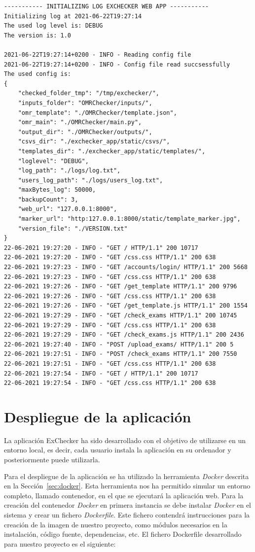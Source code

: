 \documentclass[a4paper, 12pt]{book}
\begin{document}
{\footnotesize
\begin{verbatim}
----------- INITIALIZING LOG EXCHECKER WEB APP -----------
Initializing log at 2021-06-22T19:27:14
The used log level is: DEBUG
The version is: 1.0

2021-06-22T19:27:14+0200 - INFO - Reading config file
2021-06-22T19:27:14+0200 - INFO - Config file read succsessfully
The used config is:
{
    "checked_folder_tmp": "/tmp/exchecker/",
    "inputs_folder": "OMRChecker/inputs/",
    "omr_template": "./OMRChecker/template.json",
    "omr_main": "./OMRChecker/main.py",
    "output_dir": "./OMRChecker/outputs/",
    "csvs_dir": "./exchecker_app/static/csvs/",
    "templates_dir": "./exchecker_app/static/templates/",
    "loglevel": "DEBUG",
    "log_path": "./logs/log.txt",
    "users_log_path": "./logs/users_log.txt",
    "maxBytes_log": 50000,
    "backupCount": 3,
    "web_url": "127.0.0.1:8000",
    "marker_url": "http:127.0.0.1:8000/static/template_marker.jpg",
    "version_file": "./VERSION.txt"
}
22-06-2021 19:27:20 - INFO - "GET / HTTP/1.1" 200 10717
22-06-2021 19:27:20 - INFO - "GET /css.css HTTP/1.1" 200 638
22-06-2021 19:27:23 - INFO - "GET /accounts/login/ HTTP/1.1" 200 5668
22-06-2021 19:27:23 - INFO - "GET /css.css HTTP/1.1" 200 638
22-06-2021 19:27:26 - INFO - "GET /get_template HTTP/1.1" 200 9796
22-06-2021 19:27:26 - INFO - "GET /css.css HTTP/1.1" 200 638
22-06-2021 19:27:26 - INFO - "GET /get_template.js HTTP/1.1" 200 1554
22-06-2021 19:27:29 - INFO - "GET /check_exams HTTP/1.1" 200 10745
22-06-2021 19:27:29 - INFO - "GET /css.css HTTP/1.1" 200 638
22-06-2021 19:27:29 - INFO - "GET /check_exams.js HTTP/1.1" 200 2436
22-06-2021 19:27:40 - INFO - "POST /upload_exams/ HTTP/1.1" 200 5
22-06-2021 19:27:51 - INFO - "POST /check_exams HTTP/1.1" 200 7550
22-06-2021 19:27:51 - INFO - "GET /css.css HTTP/1.1" 200 638
22-06-2021 19:27:54 - INFO - "GET / HTTP/1.1" 200 10717
22-06-2021 19:27:54 - INFO - "GET /css.css HTTP/1.1" 200 638
\end{verbatim}
}

\section{Despliegue de la aplicación} 
\label{sec:despliegue}

La aplicación ExChecker ha sido desarrollado con el objetivo de utilizarse en
un entorno local, es decir, cada usuario instala la aplicación en su ordenador y
posteriormente puede utilizarla.

Para el despliegue de la aplicación se ha utilizado la herramienta \textit{Docker}
\cite{docker:documentation} descrita
en la Sección~\ref{sec:docker}. Esta herramienta nos ha permitido simular un entorno
completo, llamado contenedor, en el que se ejecutará la aplicación web. Para la creación
del contenedor \textit{Docker} en primera instancia se debe instalar \textit{Docker} en el sistema
y crear un fichero \textit{Dockerfile}.
Este fichero contendrá instrucciones para la creación de la imagen de nuestro proyecto,
como módulos necesarios en la instalación, código fuente, dependencias, etc.
El fichero Dockerfile desarrollado para nuestro proyecto es el siguiente:
\end{document}
